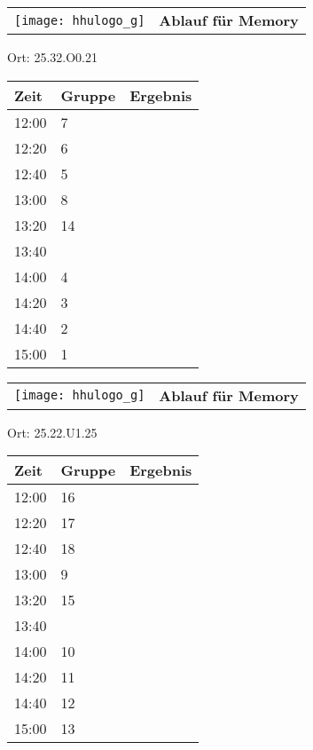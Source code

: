 \documentclass[a4paper,10pt]{article}
\def\spielg{Memory}
\def\raumg{25.32.O0.21}
\def\raumgg{25.22.U1.25}
\begin{document}
  \begin{tabularx}{\textwidth}{lc}
    \texttt{[image: hhulogo\_g]}
  & {\Huge \textbf{Ablauf für \spielg}}
  \end{tabularx}
  \LARGE
  \begin{center}
    \vspace{1cm} 
    Ort: \raumg
 
    \vspace{2cm} 
    \begin{tabularx}{0.6\textwidth}{X||X|X}
	\textbf{Zeit} &\textbf{Gruppe} & \textbf{Ergebnis} \\ \hline \hline
	12:00 &	7	&	\\ \hline
	12:20 &	6	&	\\ \hline
	12:40 &	5	&	\\ \hline

	13:00 &	8	&	\\ \hline
	13:20 &	14	&	\\ \hline
	13:40 &		&	\\ \hline

	14:00 &	4	&	\\ \hline
	14:20 &	3	&	\\ \hline
	14:40 &	2	&	\\ \hline

	15:00 &	1	&	\\ \hline
      
    \end{tabularx}
   \end{center} 
   \newpage
  \begin{tabularx}{\textwidth}{lc}
    \texttt{[image: hhulogo\_g]}
  & {\Huge \textbf{Ablauf für \spielg}}
  \end{tabularx}
  \LARGE
  \begin{center}
    \vspace{1cm} 
    Ort: \raumgg

    \vspace{2cm} 
    \begin{tabularx}{0.6\textwidth}{X||X|X}
	\textbf{Zeit} &\textbf{Gruppe} & \textbf{Ergebnis}	\\ \hline \hline
	12:00 &	16	&	\\ \hline
	12:20 &	17	&	\\ \hline
	12:40 & 18	&	\\ \hline

	13:00 &	9	&	\\ \hline
	13:20 &	15	&	\\ \hline
	13:40 &		&	\\ \hline

	14:00 & 10	&	\\ \hline
	14:20 &	11	&	\\ \hline
	14:40 &	12	&	\\ \hline

	15:00 &	13	&	\\ \hline
      
    \end{tabularx}
    \end{center} 
   \newpage
\end{document}
